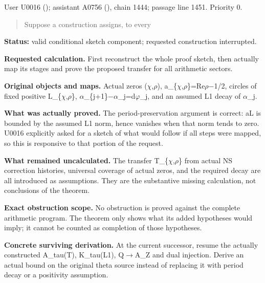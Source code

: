 \documentclass[10pt,a4paper,oneside]{report}
\begin{document}
User U0016 (\protect{});
assistant A0756 (\protect{}),
chain 1444; passage line 1451. Priority 0.

\begin{quote}
Suppose a construction assigns, to every
\end{quote}

\textbf{Status:} valid conditional sketch component; requested
construction interrupted.

\textbf{Requested calculation.} First reconstruct the whole proof
sketch, then actually map its stages and prove the proposed transfer for
all arithmetic sectors.

\textbf{Original objects and maps.} Actual zeros
(\allowbreak{}\ensuremath{χ}\allowbreak{},\allowbreak{}\ensuremath{ρ}\allowbreak{}),
a\_\{\allowbreak{}\ensuremath{χ}\allowbreak{},\allowbreak{}\ensuremath{ρ}\allowbreak{}\}=Re\allowbreak{}\ensuremath{ρ}\allowbreak{}\allowbreak{}\ensuremath{−}\allowbreak{}1/2,
circles of fixed positive
L\_\{\allowbreak{}\ensuremath{χ}\allowbreak{},\allowbreak{}\ensuremath{ρ}\allowbreak{}\},
\allowbreak{}\ensuremath{α}\allowbreak{}\_\{j+1\}\allowbreak{}\ensuremath{−}\allowbreak{}\allowbreak{}\ensuremath{α}\allowbreak{}\_j=d\allowbreak{}\ensuremath{φ}\allowbreak{}\_j,
and an assumed L1 decay of \allowbreak{}\ensuremath{α}\allowbreak{}\_j.

\textbf{What was actually proved.} The period-preservation argument is
correct: \textbar a\textbar L is bounded by the assumed L1 norm, hence
vanishes when that norm tends to zero. U0016 explicitly asked for a
sketch of what would follow if all steps were mapped, so this is
responsive to that portion of the request.

\textbf{What remained uncalculated.} The transfer
T\_\{\allowbreak{}\ensuremath{χ}\allowbreak{},\allowbreak{}\ensuremath{ρ}\allowbreak{}\}
from actual NS correction histories, universal coverage of actual zeros,
and the required decay are all introduced as assumptions. They are the
substantive missing calculation, not conclusions of the theorem.

\textbf{Exact obstruction scope.} No obstruction is proved against the
complete arithmetic program. The theorem only shows what its added
hypotheses would imply; it cannot be counted as completion of those
hypotheses.

\textbf{Concrete surviving derivation.} At the current successor, resume
the actually constructed A\_tau(T), K\_tau(L1),
Q\allowbreak{}\ensuremath{→}\allowbreak{}A\_Z and dual injection. Derive
an actual bound on the original theta source instead of replacing it
with period decay or a positivity assumption.
\end{document}
